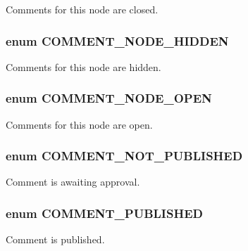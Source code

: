 \label{comment_8module_a02cedc820778a12afc48724a53acc228}
Comments for this node are closed. \hypertarget{comment_8module_a685d9e48203a970ba98b5a734eb0c2b5}{
\subsubsection[{COMMENT\_\-NODE\_\-HIDDEN}]{\setlength{\rightskip}{0pt plus 5cm}enum {\bf COMMENT\_\-NODE\_\-HIDDEN}}}
\label{comment_8module_a685d9e48203a970ba98b5a734eb0c2b5}
Comments for this node are hidden. \hypertarget{comment_8module_aff2d44a87e79044004ed35b97ab84582}{
\subsubsection[{COMMENT\_\-NODE\_\-OPEN}]{\setlength{\rightskip}{0pt plus 5cm}enum {\bf COMMENT\_\-NODE\_\-OPEN}}}
\label{comment_8module_aff2d44a87e79044004ed35b97ab84582}
Comments for this node are open. \hypertarget{comment_8module_a7676ab23ca9d0f0b4d22c02b55eb65e8}{
\subsubsection[{COMMENT\_\-NOT\_\-PUBLISHED}]{\setlength{\rightskip}{0pt plus 5cm}enum {\bf COMMENT\_\-NOT\_\-PUBLISHED}}}
\label{comment_8module_a7676ab23ca9d0f0b4d22c02b55eb65e8}
Comment is awaiting approval. \hypertarget{comment_8module_a96f12d706e4ce5b60b90141d07b02c5f}{
\subsubsection[{COMMENT\_\-PUBLISHED}]{\setlength{\rightskip}{0pt plus 5cm}enum {\bf COMMENT\_\-PUBLISHED}}}
\label{comment_8module_a96f12d706e4ce5b60b90141d07b02c5f}
Comment is published. 

